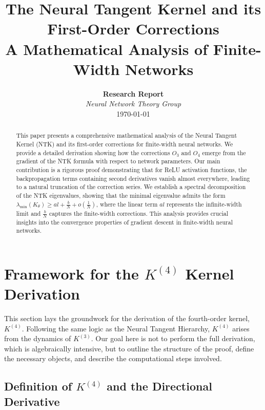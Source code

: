 \documentclass[11pt,a4paper]{article}
\title{\LARGE\textbf{The Neural Tangent Kernel and its First-Order Corrections}\\
\vspace{0.5cm}
\large A Mathematical Analysis of Finite-Width Networks}
\author{
\textbf{Research Report}\\
\vspace{0.3cm}
\textit{Neural Network Theory Group}\\
\vspace{0.2cm}
\today
}
\date{}
\theoremstyle{definition}
\begin{document}
\maketitle

\begin{abstract}
This paper presents a comprehensive mathematical analysis of the Neural Tangent Kernel (NTK) and its first-order corrections for finite-width neural networks. We provide a detailed derivation showing how the corrections $O_3$ and $O_4$ emerge from the gradient of the NTK formula with respect to network parameters. Our main contribution is a rigorous proof demonstrating that for ReLU activation functions, the backpropagation terms containing second derivatives vanish almost everywhere, leading to a natural truncation of the correction series. We establish a spectral decomposition of the NTK eigenvalues, showing that the minimal eigenvalue admits the form $\lambda_{\min}(K_\theta) \geq al + \frac{b}{N} + o(\frac{1}{N})$, where the linear term $al$ represents the infinite-width limit and $\frac{b}{N}$ captures the finite-width corrections. This analysis provides crucial insights into the convergence properties of gradient descent in finite-width neural networks.
\end{abstract}

\vspace{1cm}

\tableofcontents

\newpage

\section{Framework for the $K^{(4)}$ Kernel Derivation}

This section lays the groundwork for the derivation of the fourth-order kernel, $K^{(4)}$. Following the same logic as the Neural Tangent Hierarchy, $K^{(4)}$ arises from the dynamics of $K^{(3)}$. Our goal here is not to perform the full derivation, which is algebraically intensive, but to outline the structure of the proof, define the necessary objects, and describe the computational steps involved.

\subsection{Definition of $K^{(4)}$ and the Directional Derivative}
\end{document}
